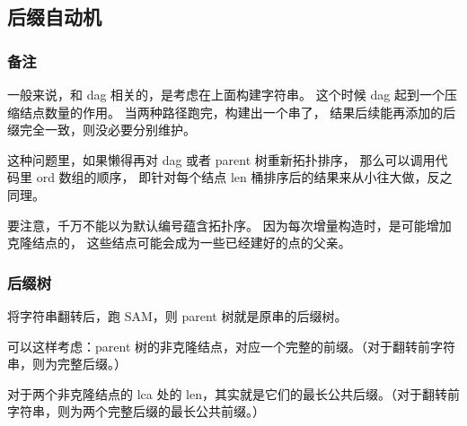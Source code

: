 \subsection{后缀自动机}



\subsubsection{备注}

一般来说，和 dag 相关的，是考虑在上面构建字符串。
这个时候 dag 起到一个压缩结点数量的作用。
当两种路径跑完，构建出一个串了，
结果后续能再添加的后缀完全一致，则没必要分别维护。

这种问题里，如果懒得再对 dag 或者 parent 树重新拓扑排序，
那么可以调用代码里 ord 数组的顺序，
即针对每个结点 len 桶排序后的结果来从小往大做，反之同理。

要注意，千万不能以为默认编号蕴含拓扑序。
因为每次增量构造时，是可能增加克隆结点的，
这些结点可能会成为一些已经建好的点的父亲。

\subsubsection{后缀树}

将字符串翻转后，跑 SAM，则 parent 树就是原串的后缀树。

可以这样考虑：parent 树的非克隆结点，对应一个完整的前缀。（对于翻转前字符串，则为完整后缀。）

对于两个非克隆结点的 lca 处的 len，其实就是它们的最长公共后缀。（对于翻转前字符串，则为两个完整后缀的最长公共前缀。）


